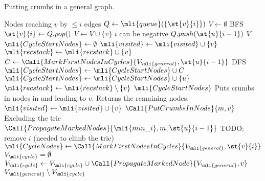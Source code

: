 \begin{algorithm}[t]
	\caption{Putting crumbs in a general graph.}\label{alg:general_crumbs}
	\begin{algorithmic}[1]
		\Comment Nodes reaching $v$ by $\le i$ edges
			\State $Q \gets \mli{queue}(\{\st{v}{i}\})$
			\State $V \gets \emptyset$
			\Comment BFS
				\State $\st{v}{i} \gets Q.pop()$
				\State $V \gets V \cup \{v\}$
				\Comment $i$ can be negative
							\State $Q.push(\st{u}{i-1})$
						\EndIf
					\EndFor
				\EndIf
			\EndWhile
			\State \Return $V$
		\EndFunction
		\Statex
			\State $\mli{CycleStartNodes} \gets \emptyset$
				\Comment 
			\State $\mli{visited} \gets \mli{visited} \cup \{v\}$
			\State $\mli{recstack} \gets \mli{recstack} \cup \{v\}$
						\State $C \gets \Call{MarkFirstNodesInCycles}{V_\mli{general}, \st{u}{i-1}}$
							\Comment DFS
						\State $\mli{CycleStartNodes} \gets \mli{CycleStartNodes} \cup C$
						\State $\mli{CycleStartNodes} \gets \mli{CycleStartNodes} \cup \{u\}$
					\EndIf
				\EndIf
			\EndFor
			\State $\mli{recstack} \gets \mli{recstack} \setminus \{v\}$
			\State \Return $\mli{CycleStartNodes}$
		\EndFunction
		\Statex
			\Statex \Comment Puts crumbs in nodes in and leading to $v$. Returns the remaining nodes.
				\State $\mli{visited} \gets \mli{visited} \cup \{v\}$
				\State $\Call{PutCrumbsInNode}{m, v}$
					 \Comment Excluding the trie
						\State $\Call{PropagateMarkedNodes}{\mli{min\_i}, m, \st{u}{i-1}}$
					\EndFor
			\EndIf
		\EndFunction
		\Statex
			\State \Comment TODO: remove $i$ (needed to climb the trie)
			\State $\mli{CycleNodes} \gets \Call{MarkFirstNodesInCycles}{V_\mli{general}, \st{v}{i}}$
			\State $V_\mli{cycle} = \emptyset$
				\State $V_\mli{cycle} \gets V_\mli{cycle} \cup \Call{PropagateMarkedNode}{V_\mli{general}, v}$
			\EndFor
			\State \Return $V_\mli{general} \setminus V_\mli{cycle}$
		\EndFunction

\end{algorithmic}
\end{algorithm}
